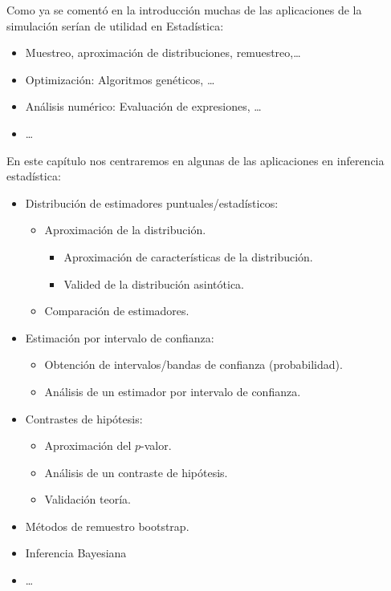 \documentclass[
]{book}
\theoremstyle{break}
\theoremstyle{definition}
\theoremstyle{definition}
\theoremstyle{definition}
\theoremstyle{remark}
\begin{document}
Como ya se comentó en la introducción muchas de las aplicaciones de la simulación serían de utilidad en Estadística:

\begin{itemize}
\item
  Muestreo, aproximación de distribuciones,
  remuestreo,\ldots{}
\item
  Optimización: Algoritmos genéticos, \ldots{}
\item
  Análisis numérico: Evaluación de expresiones, \ldots{}
\item
  \ldots{}
\end{itemize}

En este capítulo nos centraremos en
algunas de las aplicaciones en inferencia estadística:

\begin{itemize}
\item
  Distribución de estimadores puntuales/estadísticos:

  \begin{itemize}
  \item
    Aproximación de la distribución.

    \begin{itemize}
    \item
      Aproximación de características de la distribución.
    \item
      Valided de la distribución asintótica.
    \end{itemize}
  \item
    Comparación de estimadores.
  \end{itemize}
\item
  Estimación por intervalo de confianza:

  \begin{itemize}
  \item
    Obtención de intervalos/bandas de confianza (probabilidad).
  \item
    Análisis de un estimador por intervalo de confianza.
  \end{itemize}
\item
  Contrastes de hipótesis:

  \begin{itemize}
  \item
    Aproximación del \(p\)-valor.
  \item
    Análisis de un contraste de hipótesis.
  \item
    Validación teoría.
  \end{itemize}
\item
  Métodos de remuestro bootstrap.
\item
  Inferencia Bayesiana
\item
  \ldots{}
\end{itemize}
\end{document}
